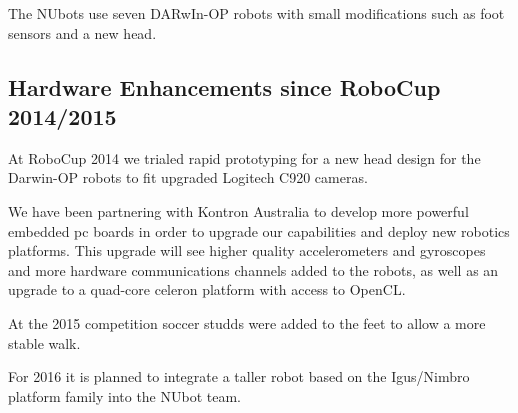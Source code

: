\documentclass{llncs}
\begin{document}
The NUbots use seven DARwIn-OP robots with small modifications such as foot sensors and a new head.


\subsection{Hardware Enhancements since RoboCup 2014/2015}
At RoboCup 2014 we trialed rapid prototyping for a new head design for the Darwin-OP robots to fit upgraded Logitech C920 cameras. %

We have been partnering with Kontron Australia to develop more powerful embedded pc boards in order to upgrade our capabilities and deploy new robotics platforms. This upgrade will see higher quality accelerometers and gyroscopes and more hardware communications channels added to the robots, as well as an upgrade to a quad-core celeron platform with access to OpenCL.

At the 2015 competition soccer studds were added to the feet to allow a more stable walk.

For 2016 it is planned to integrate a taller robot based on the Igus/Nimbro platform family into the NUbot team.

\end{document}
